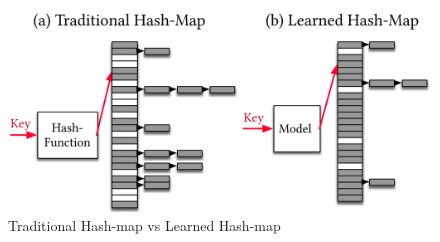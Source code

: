 \begin{figure}[h!]
	\includegraphics[scale=0.2]{figures/learned_index.png}
	\caption{Traditional Hash-map vs Learned Hash-map \cite{learning-index}}
	\label{fig:learned_index}
\end{figure}

\vspace{1mm}
\noindent

